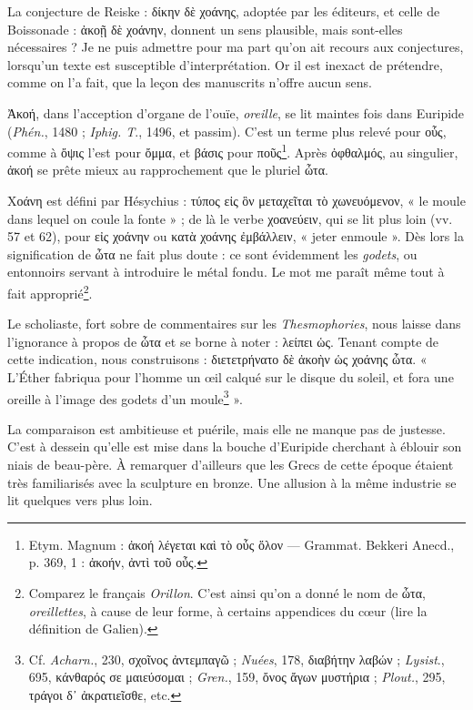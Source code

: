 \documentclass{book}%
\newcommand{\italique}[1]{\textit{#1}}%
\newcommand{\note}[1]{\footnote{#1}}
\begin{document}
La conjecture de Reiske : δίκην δὲ χοάνης, adoptée par les éditeurs, et celle de Boissonade : ἀκοῇ δὲ χοάνην, donnent un sens plausible, mais sont-elles nécessaires ? Je ne puis admettre pour ma part qu'on ait recours aux conjectures, lorsqu'un texte est susceptible d'interprétation. Or il est inexact de prétendre, comme on l'a fait, que la leçon des manuscrits n'offre aucun sens.

Ἀκοή, dans l'acception d'organe de l'ouïe, \italique{oreille}, se lit maintes fois dans Euripide (\italique{Phén.}, 1480 ; \italique{Iphig. T}., 1496, et passim). 
C'est un terme plus relevé pour οὗς, comme à ὄψις l'est pour ὄμμα, et βάσις pour ποῦς\note{Etym. Magnum : ἀκοή λέγεται καὶ τὸ οὖς ὅλον --- Grammat. Bekkeri Anecd., p. 369, 1 : ἀκοήν, ἀντὶ τοῦ οὖς.}. 
Après ὀφθαλμός, au singulier, ἀκοή se prête mieux au rapprochement que le pluriel ὦτα. 

Χοάνη est défini par Hésychius : τύπος εἰς ὃν μεταχεῖται τὸ χωνευόμενον, « le moule dans lequel on coule la fonte » ; de là le verbe χοανεύειν, qui se lit plus loin (vv. 57 et 62), pour εἰς χοάνην ou κατὰ χοάνης ἐμβάλλειν, « jeter enmoule ». Dès lors la signification de ὦτα ne fait plus doute : ce sont évidemment les \italique{godets}, ou entonnoirs servant à introduire le métal fondu. Le mot me paraît même tout à fait approprié\note{Comparez le français \italique{Orillon}. C'est ainsi qu'on a donné le nom de ὦτα, \italique{oreillettes}, à cause de leur forme, à certains appendices du cœur (lire la définition de Galien).}. 

Le scholiaste, fort sobre de commentaires sur les \italique{Thesmophories}, nous laisse dans l'ignorance à propos de ὦτα et se borne à noter : λείπει ὡς. 
Tenant compte de cette indication, nous construisons : διετετρήνατο δὲ ἀκοὴν ὡς χοάνης ὦτα. « L'Éther fabriqua pour l'homme un œil calqué sur le disque du soleil, et fora une oreille à l'image des godets d'un moule\note{Cf. \italique{Acharn.}, 230, σχοῖνος ἀντεμπαγῶ ; \italique{Nuées}, 178, διαβήτην λαβών ; \italique{Lysist}., 695, κάνθαρός σε μαιεύσομαι ; \italique{Gren.}, 159, ὄνος ἄγων μυστήρια ; \italique{Plout.}, 295, τράγοι δ᾽ ἀκρατιεῖσθε, etc.} ». 

La comparaison est ambitieuse et puérile, mais elle ne manque pas de justesse. C'est à dessein qu'elle est mise dans la bouche d'Euripide cherchant à éblouir son niais de beau-père.
À remarquer d'ailleurs que les Grecs de cette époque étaient très familiarisés avec la sculpture en bronze. Une allusion à la même industrie se lit quelques vers plus loin.
\end{document}
